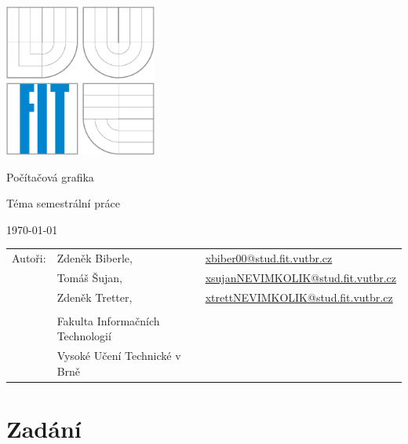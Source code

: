 \documentclass[12pt,a4paper,titlepage,final]{report}
\makeatletter
\newcommand\Course{Počítačová grafika}
\newcommand\WorkTitle{Téma semestrální práce}
\newcommand\AuthorA{Zdeněk Biberle}
\newcommand\AuthorAEmail{xbiber00@stud.fit.vutbr.cz}
\newcommand\AuthorB{Tomáš Šujan}
\newcommand\AuthorBEmail{xsujanNEVIMKOLIK@stud.fit.vutbr.cz}
\newcommand\AuthorC{Zdeněk Tretter}
\newcommand\AuthorCEmail{xtrettNEVIMKOLIK@stud.fit.vutbr.cz}
\newcommand\Faculty{Fakulta Informačních Technologií}
\newcommand\School{Vysoké Učení Technické v Brně}
\makeatother
\begin{document}
	\begin{titlepage}
	\begin{center}
		\includegraphics[height=5cm]{images/logo.eps}
	\end{center}
	\vfill
	\begin{center}
		\begin{Large}
			\Course\\
		\end{Large}
		\bigskip
		\begin{Huge}
			\WorkTitle\\
		\end{Huge}
	\end{center}
	\vfill
	\begin{center}
		\begin{large}
			\today
		\end{large}
	\end{center}
	\vfill
	\begin{flushleft}
		\begin{large}
			\begin{tabular}{lll}
				Autoři: & \AuthorA, & \url{\AuthorAEmail} \\
				        & \AuthorB, & \url{\AuthorBEmail} \\
				        & \AuthorC, & \url{\AuthorCEmail} \\
				& & \\
				& \Faculty \\
				& \School \\
			\end{tabular}
		\end{large}
	\end{flushleft}
\end{titlepage}		
	
	
\tableofcontents

\newpage
\chapter{Zadání}
\end{document}
